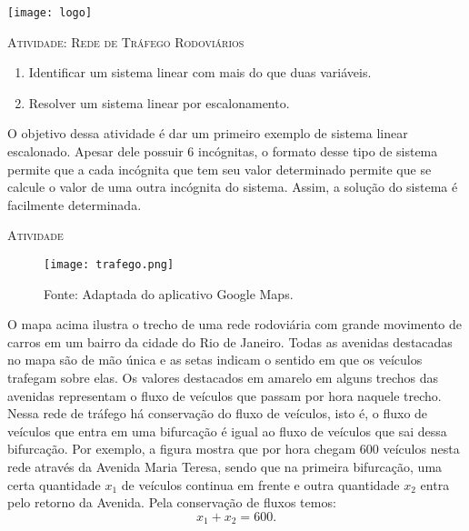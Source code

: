 \documentclass[10 pt,usenames,dvipsnames, oneside]{article}
\begin{document}
\begin{center}
  \begin{minipage}[l]{3cm}
\texttt{[image: logo]}    
\end{minipage}\hfill
\begin{minipage}[r]{.8\textwidth}
 {\Large \scshape Atividade: Rede de Tráfego Rodoviários}  
\end{minipage}
\end{center}
\vspace{.2cm}

\ifdefined\prof

\begin{goals}
\begin{enumerate}
\item Identificar um sistema linear com mais do que duas variáveis.
\item Resolver um sistema linear por escalonamento.
\end{enumerate}

\tcblower

O objetivo dessa atividade é dar um primeiro exemplo de sistema linear escalonado. Apesar dele possuir 6 incógnitas, o formato desse tipo de sistema permite que a cada incógnita que tem seu valor determinado permite que se calcule o valor de uma outra incógnita do sistema. Assim, a solução do sistema é facilmente determinada.
\end{goals}

\bigskip
\begin{center}
{\large \scshape Atividade}
\end{center}
\fi

\begin{figure}[H]
\centering

\noindent\texttt{[image: trafego.png]}
\caption{Fonte: Adaptada do aplicativo Google Maps.}
\end{figure}

O mapa acima ilustra o trecho de uma rede rodoviária com grande movimento de carros em um bairro da cidade do Rio de Janeiro. Todas as avenidas destacadas no mapa são de mão única e as setas indicam o sentido em que os veículos trafegam sobre elas. Os valores destacados em amarelo em alguns trechos das avenidas representam o fluxo de veículos que passam por hora naquele trecho. Nessa rede de tráfego há conservação do fluxo de veículos, isto é, o fluxo de veículos que entra em uma bifurcação é igual ao fluxo de veículos que sai dessa bifurcação. Por exemplo, a figura mostra que por hora chegam $600$ veículos nesta rede através da Avenida Maria Teresa, sendo que na primeira bifurcação, uma certa quantidade $x_1$ de veículos continua em frente e outra quantidade $x_2$ entra pelo retorno da Avenida.  Pela conservação de fluxos temos:
$$
x_1 + x_2 = 600.
$$
\end{document}
